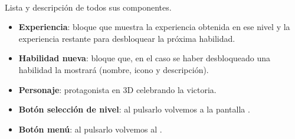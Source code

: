 \paragraph{}
Lista y descripción de todos sus componentes.

\begin{itemize}
    \item \textbf{Experiencia}: bloque que muestra la experiencia obtenida
    en ese nivel y la experiencia restante para desbloquear la próxima habilidad.
    \item \textbf{Habilidad nueva}: bloque que, en el caso se haber desbloqueado
    una habilidad la mostrará (nombre, icono y descripción). 
    \item \textbf{Personaje}: protagonista en 3D celebrando la victoria.
    \item \textbf{Botón selección de nivel}: al pulsarlo volvemos a la pantalla \selnivel.
    \item \textbf{Botón menú}: al pulsarlo volvemos al \menu.
\end{itemize}
